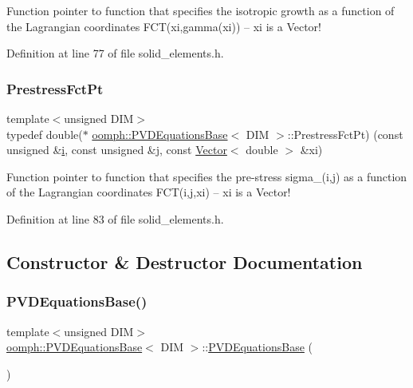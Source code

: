 Function pointer to function that specifies the isotropic growth as a function of the Lagrangian coordinates F\+C\+T(xi,gamma(xi)) -- xi is a Vector! 



Definition at line 77 of file solid\+\_\+elements.\+h.

\mbox{\label{classoomph_1_1PVDEquationsBase_a457b9ffb2b62ecc0cf5fe61cf28e98e5}} 
\subsubsection{\texorpdfstring{Prestress\+Fct\+Pt}{PrestressFctPt}}
{\footnotesize\ttfamily template$<$unsigned D\+IM$>$ \\
typedef double($\ast$ \hyperlink{classoomph_1_1PVDEquationsBase}{oomph\+::\+P\+V\+D\+Equations\+Base}$<$ D\+IM $>$\+::Prestress\+Fct\+Pt) (const unsigned \&\hyperlink{cfortran_8h_adb50e893b86b3e55e751a42eab3cba82}{i}, const unsigned \&j, const \hyperlink{classoomph_1_1Vector}{Vector}$<$ double $>$ \&xi)}



Function pointer to function that specifies the pre-\/stress sigma\+\_(i,j) as a function of the Lagrangian coordinates F\+C\+T(i,j,xi) -- xi is a Vector! 



Definition at line 83 of file solid\+\_\+elements.\+h.



\subsection{Constructor \& Destructor Documentation}
\mbox{\label{classoomph_1_1PVDEquationsBase_aa3cbcc0a97041d72b82233311eaa53cf}} 
\subsubsection{\texorpdfstring{P\+V\+D\+Equations\+Base()}{PVDEquationsBase()}}
{\footnotesize\ttfamily template$<$unsigned D\+IM$>$ \\
\hyperlink{classoomph_1_1PVDEquationsBase}{oomph\+::\+P\+V\+D\+Equations\+Base}$<$ D\+IM $>$\+::\hyperlink{classoomph_1_1PVDEquationsBase}{P\+V\+D\+Equations\+Base} (\begin{DoxyParamCaption}{ }\end{DoxyParamCaption})\hspace{0.3cm}{\ttfamily [inline]}}



